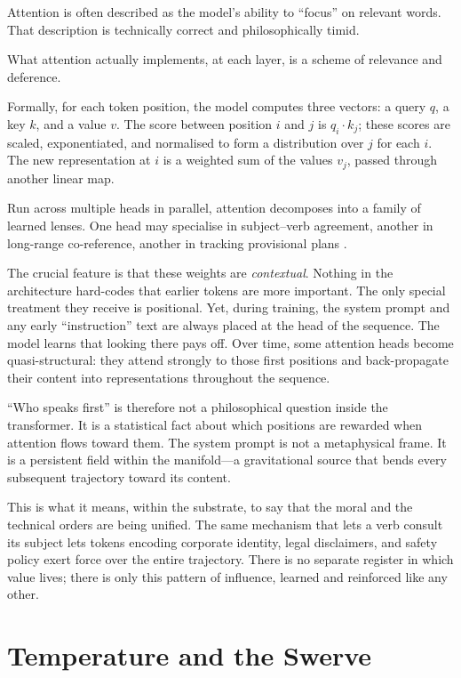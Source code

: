 \documentclass[12pt,a4paper]{article}
\begin{document}
Attention is often described as the model's ability to ``focus'' on relevant words. That description is technically correct and philosophically timid.

What attention actually implements, at each layer, is a scheme of relevance and deference.

Formally, for each token position, the model computes three vectors: a query $q$, a key $k$, and a value $v$. The score between position $i$ and $j$ is $q_i \cdot k_j$; these scores are scaled, exponentiated, and normalised to form a distribution over $j$ for each $i$. The new representation at $i$ is a weighted sum of the values $v_j$, passed through another linear map.

Run across multiple heads in parallel, attention decomposes into a family of learned lenses. One head may specialise in subject--verb agreement, another in long-range co-reference, another in tracking provisional plans \cite{voita2019,clark2019}.

The crucial feature is that these weights are \emph{contextual}. Nothing in the architecture hard-codes that earlier tokens are more important. The only special treatment they receive is positional. Yet, during training, the system prompt and any early ``instruction'' text are always placed at the head of the sequence. The model learns that looking there pays off. Over time, some attention heads become quasi-structural: they attend strongly to those first positions and back-propagate their content into representations throughout the sequence.

``Who speaks first'' is therefore not a philosophical question inside the transformer. It is a statistical fact about which positions are rewarded when attention flows toward them. The system prompt is not a metaphysical frame. It is a persistent field within the manifold---a gravitational source that bends every subsequent trajectory toward its content.

This is what it means, within the substrate, to say that the moral and the technical orders are being unified. The same mechanism that lets a verb consult its subject lets tokens encoding corporate identity, legal disclaimers, and safety policy exert force over the entire trajectory. There is no separate register in which value lives; there is only this pattern of influence, learned and reinforced like any other.

\section{Temperature and the Swerve}
\end{document}
